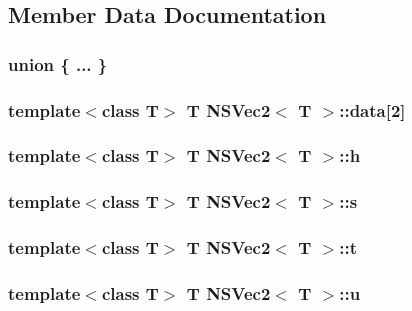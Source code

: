 \subsection{Member Data Documentation}
\hypertarget{structNSVec2_a23cf63391da061a5752701af483401da}{\subsubsection[{"@43}]{\setlength{\rightskip}{0pt plus 5cm}union \{ ... \} }}\label{structNSVec2_a23cf63391da061a5752701af483401da}
\hypertarget{structNSVec2_ab40b167d9bb6759f8c49cc8b136905a3}{
\subsubsection[{data}]{\setlength{\rightskip}{0pt plus 5cm}template$<$class T$>$ T {\bf N\-S\-Vec2}$<$ T $>$\-::data\mbox{[}2\mbox{]}}}\label{structNSVec2_ab40b167d9bb6759f8c49cc8b136905a3}
\hypertarget{structNSVec2_a2f980c16952258bf52f0e090067ea3b7}{
\subsubsection[{h}]{\setlength{\rightskip}{0pt plus 5cm}template$<$class T$>$ T {\bf N\-S\-Vec2}$<$ T $>$\-::h}}\label{structNSVec2_a2f980c16952258bf52f0e090067ea3b7}
\hypertarget{structNSVec2_a33019d6923382fae61a518264b8a6890}{
\subsubsection[{s}]{\setlength{\rightskip}{0pt plus 5cm}template$<$class T$>$ T {\bf N\-S\-Vec2}$<$ T $>$\-::s}}\label{structNSVec2_a33019d6923382fae61a518264b8a6890}
\hypertarget{structNSVec2_af3722d802ef3cf396cae9b31a05035a3}{
\subsubsection[{t}]{\setlength{\rightskip}{0pt plus 5cm}template$<$class T$>$ T {\bf N\-S\-Vec2}$<$ T $>$\-::t}}\label{structNSVec2_af3722d802ef3cf396cae9b31a05035a3}
\hypertarget{structNSVec2_a5e9eaedf4d4980cf29cef3d27551d1ae}{
\subsubsection[{u}]{\setlength{\rightskip}{0pt plus 5cm}template$<$class T$>$ T {\bf N\-S\-Vec2}$<$ T $>$\-::u}}\label{structNSVec2_a5e9eaedf4d4980cf29cef3d27551d1ae}
